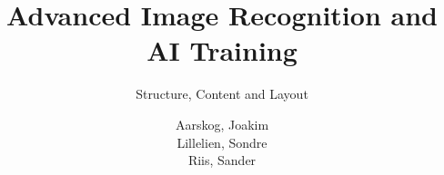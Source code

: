 \documentclass[
]{thesistemplate}
\affiliation{Østfold University College}
\title{Advanced Image Recognition and AI Training} %
\subtitle{Structure, Content and Layout}
\author{
    Aarskog, Joakim\\
    Lillelien, Sondre\\
    Riis, Sander\\
}
\begin{document}
\maketitle          %
\frontmatter        %





\tableofcontents    %

\listoffigures      %
\listoftables       %
\lstlistoflistings  %

\mainmatter  %










\printglossaries            %

\appendix                   %
\end{document}
